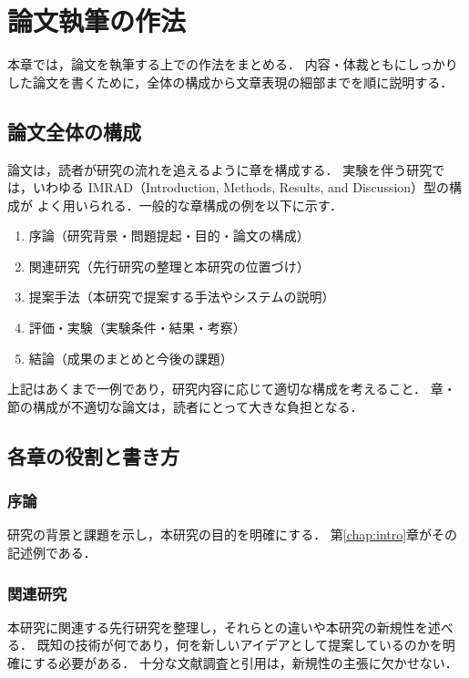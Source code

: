 \chapter{論文執筆の作法}
\label{chap:writing}

本章では，論文を執筆する上での作法をまとめる．
内容・体裁ともにしっかりした論文を書くために，全体の構成から文章表現の細部までを順に説明する．

\section{論文全体の構成}
\label{sec:overall-structure}
論文は，読者が研究の流れを追えるように章を構成する．
実験を伴う研究では，いわゆる IMRAD（Introduction, Methods, Results, and Discussion）型の構成が
よく用いられる．一般的な章構成の例を以下に示す．

\begin{enumerate}
    \item 序論（研究背景・問題提起・目的・論文の構成）
    \item 関連研究（先行研究の整理と本研究の位置づけ）
    \item 提案手法（本研究で提案する手法やシステムの説明）
    \item 評価・実験（実験条件・結果・考察）
    \item 結論（成果のまとめと今後の課題）
\end{enumerate}

上記はあくまで一例であり，研究内容に応じて適切な構成を考えること．
章・節の構成が不適切な論文は，読者にとって大きな負担となる\cite{kisaragi}．

\section{各章の役割と書き方}
\label{sec:each-chapter}

\subsection{序論}
研究の背景と課題を示し，本研究の目的を明確にする．
第\ref{chap:intro}章がその記述例である．

\subsection{関連研究}
本研究に関連する先行研究を整理し，それらとの違いや本研究の新規性を述べる．
既知の技術が何であり，何を新しいアイデアとして提案しているのかを明確にする必要がある．
十分な文献調査と引用は，新規性の主張に欠かせない．

